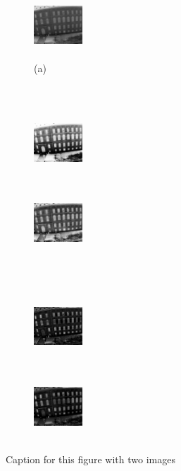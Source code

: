 \documentclass[a4paper, 11 pt, conference]{ieeeconf}      %
\begin{document}
\begin{figure}[]
    \centering
    \begin{subfigure}{\textwidth}
        \centering
        \includegraphics[width=0.20\textwidth, height=2.5cm]{rsc/res1/520.png} 
        \caption{(a)}
    \end{subfigure}\\
    \begin{subfigure}{\textwidth}
        \includegraphics[width=0.20\textwidth, height=2.5cm]{rsc/res1/520HE.png}
    \end{subfigure}
    \begin{subfigure}{\textwidth}
        \includegraphics[width=0.20\textwidth, height=2.5cm]{rsc/res1/520CLAHE.png} 
    \end{subfigure}\\
    \begin{subfigure}{\textwidth}
        \includegraphics[width=0.20\textwidth, height=2.5cm]{rsc/res1/520PAPER.png} 
    \end{subfigure}
    \begin{subfigure}{\textwidth}
        \includegraphics[width=0.20\textwidth, height=2.5cm]{rsc/res1/520PROP.png}
    \end{subfigure}
 
    \caption{Caption for this figure with two images}
    \label{fig:image2}
\end{figure}
\end{document}
